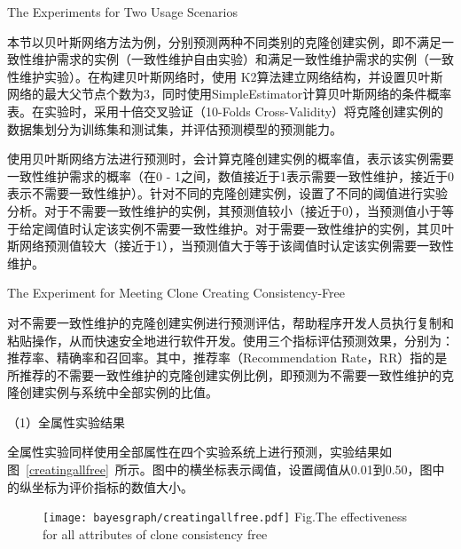 {The Experiments for Two Usage Scenarios}

本节以贝叶斯网络方法为例，分别预测两种不同类别的克隆创建实例，即不满足一致性维护需求的实例（一致性维护自由实验）和满足一致性维护需求的实例（一致性维护实验）。在构建贝叶斯网络时，使用 K2算法建立网络结构，并设置贝叶斯网络的最大父节点个数为$3$，同时使用SimpleEstimator计算贝叶斯网络的条件概率表。在实验时，采用十倍交叉验证（10-Folds Cross-Validity）将克隆创建实例的数据集划分为训练集和测试集，并评估预测模型的预测能力。

使用贝叶斯网络方法进行预测时，会计算克隆创建实例的概率值，表示该实例需要一致性维护需求的概率（在0 - 1之间，数值接近于1表示需要一致性维护，接近于0表示不需要一致性维护）。针对不同的克隆创建实例，设置了不同的阈值进行实验分析。对于不需要一致性维护的实例，其预测值较小（接近于0），当预测值小于等于给定阈值时认定该实例不需要一致性维护。对于需要一致性维护的实例，其贝叶斯网络预测值较大（接近于1），当预测值大于等于该阈值时认定该实例需要一致性维护。

{The Experiment for Meeting Clone Creating Consistency-Free}

对不需要一致性维护的克隆创建实例进行预测评估，帮助程序开发人员执行复制和粘贴操作，从而快速安全地进行软件开发。使用三个指标评估预测效果，分别为：推荐率、精确率和召回率。其中，推荐率（Recommendation Rate，RR）指的是所推荐的不需要一致性维护的克隆创建实例比例，即预测为不需要一致性维护的克隆创建实例与系统中全部实例的比值。


（1）全属性实验结果

全属性实验同样使用全部属性在四个实验系统上进行预测，实验结果如图~\ref{creatingallfree}~所示。图中的横坐标表示阈值，设置阈值从0.01到0.50，图中的纵坐标为评价指标的数值大小。

\begin{figure}[h]
\centering
\texttt{[image: bayesgraph/creatingallfree.pdf]}
{Fig.$\!$}{The effectiveness for all attributes of clone consistency free}
\vspace{-1em}
\end{figure}

